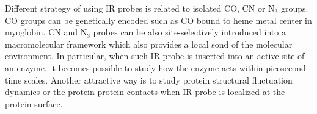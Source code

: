 \documentclass[a4paper,titlepage,twoside,fleqn,12pt]{book}
\begin{document}
\begin{refsection}
Different strategy of using IR probes is related to isolated CO, CN or N$_3$ groups.
CO groups can be genetically encoded
such as CO bound to heme metal center in myoglobin. 
CN and N$_3$ probes can be also site-selectively introduced into a macromolecular 
framework\citep{Jo.Culik.Korendovych.DeGrado.Gai.Biochem.2010,
Wang.Winblade.Johnson.Tirrell.Grabstein.ChemBioChem.2008,Fafarman.Webb.Chuang.Boxer.JACS.2006,
Kiick.Saxon.Tirrell.Bertozzi.PNAS.2002} 
which also provides
a local sond of the molecular environment. In particular, when such IR probe
is inserted into an active site of an enzyme, it becomes possible to study
how the enzyme acts within picosecond time scales.\citep{Fried.Bagchi.Boxer.Science.2014,Bagchi.Boxer.Fayer.JPCB.2012,
Ye.Zaitseva.Caltabiano.Schertler.Sakmar.Deupi.Vogel.Nature.2010} 
Another attractive way is to study protein structural fluctuation dynamics
or the protein-protein contacts when IR probe is localized at the protein 
surface\citep{Taskent-Sezgin.Chung.Banerjee.Nagarajan.Dyer.Carrico.Raleigh.AngewChemInt.2010,
Stafford.Ensign.Webb.JPCB.2010,Oh.Lee.Joo.Han.Cho.JPCB.2008}.  


\end{refsection}
\end{document}
